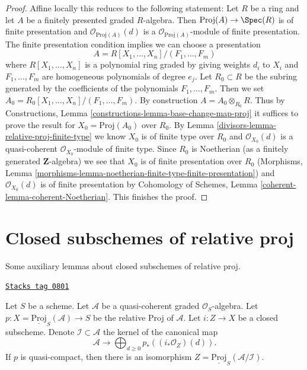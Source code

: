 \begin{proof}

Affine locally this reduces to the following statement:
Let $R$ be a ring and let $A$ be a finitely presented graded $R$-algebra.
Then $\text{Proj}(A) \to \Spec(R)$ is of finite presentation
and $\mathcal{O}_{\text{Proj}(A)}(d)$ is a
$\mathcal{O}_{\text{Proj}(A)}$-module of finite presentation.
The finite presentation condition implies we can choose
a presentation
$$
A = R[X_1, \ldots, X_n]/(F_1, \ldots, F_m)
$$
where $R[X_1, \ldots, X_n]$ is a polynomial ring graded by giving
weights $d_i$ to $X_i$ and $F_1, \ldots, F_m$ are homogeneous polynomials
of degree $e_j$. Let $R_0 \subset R$ be the subring generated by
the coefficients of the polynomials $F_1, \ldots, F_m$.
Then we set $A_0 = R_0[X_1, \ldots, X_n]/(F_1, \ldots, F_m)$.
By construction $A = A_0 \otimes_{R_0} R$.
Thus by
Constructions, Lemma \ref{constructions-lemma-base-change-map-proj}
it suffices to prove the result for $X_0 = \text{Proj}(A_0)$ over $R_0$.
By Lemma \ref{divisors-lemma-relative-proj-finite-type}
we know $X_0$ is of finite type over $R_0$ and
$\mathcal{O}_{X_0}(d)$ is a quasi-coherent $\mathcal{O}_{X_0}$-module
of finite type.
Since $R_0$ is Noetherian (as a finitely generated $\mathbf{Z}$-algebra)
we see that $X_0$ is of finite presentation over $R_0$
(Morphisms, Lemma
\ref{morphisms-lemma-noetherian-finite-type-finite-presentation})
and $\mathcal{O}_{X_0}(d)$ is of finite presentation by
Cohomology of Schemes, Lemma \ref{coherent-lemma-coherent-Noetherian}.
This finishes the proof.
\end{proof}

\section{Closed subschemes of relative proj}
\label{divisors-section-closed-in-relative-proj}
Some auxiliary lemmas about closed subschemes of relative proj.

\begin{lemma}
\label{divisors-lemma-closed-subscheme-proj}
\href{https://stacks.math.columbia.edu/tag/0801}{\texttt{Stacks tag 0801}}

Let $S$ be a scheme. Let $\mathcal{A}$ be a quasi-coherent graded
$\mathcal{O}_S$-algebra. Let
$p : X = \underline{\text{Proj}}_S(\mathcal{A}) \to S$ be the relative
Proj of $\mathcal{A}$. Let $i : Z \to X$ be a closed subscheme. Denote
$\mathcal{I} \subset \mathcal{A}$ the kernel of the canonical map
$$
\mathcal{A}
\longrightarrow
\bigoplus\nolimits_{d \geq 0} p_*\left((i_*\mathcal{O}_Z)(d)\right).
$$
If $p$ is quasi-compact, then there is an isomorphism
$Z = \underline{\text{Proj}}_S(\mathcal{A}/\mathcal{I})$.
\end{lemma}

